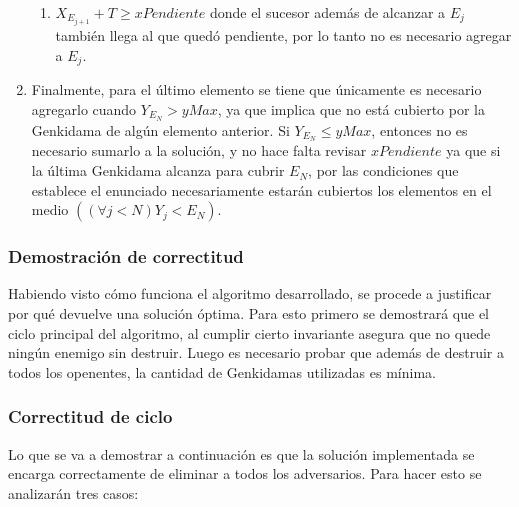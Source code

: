\begin{enumerate}
{\begin{enumerate}
{\begin{enumerate}
{\begin{enumerate}
{									alcanza a un enemigo que quedó dependiendo de
									una futura Genkidama, por lo tanto debo agregar
									a $E_j$. Se asignan $xPendiente = 0$ y $maxY = Y_{E_j} + T$.
								}
								\item{
									\label{ej2_imp:caso_cubierto}
									$X_{E_{j+1}} + T \geq xPendiente$ donde el
									sucesor además de alcanzar a $E_j$ también llega
									al que quedó pendiente, por lo tanto no es
									necesario agregar a	$E_j$.
								}
							\end{enumerate}
						}
					\end{enumerate}
				}
				\end{enumerate}
			}
			\item{
				\label{ej2_imp:caso_n}
				Finalmente, para el último elemento se tiene que únicamente
				es necesario agregarlo cuando $Y_{E_N} > yMax$, ya que
				implica que no está cubierto por la Genkidama de algún
				elemento anterior. Si $Y_{E_N} \leq yMax$, entonces no es
				necesario sumarlo a la solución, y no hace falta revisar
				$xPendiente$ ya que si la última Genkidama alcanza para
				cubrir $E_N$, por las condiciones que establece el
				enunciado necesariamente estarán cubiertos los elementos en
				el medio $((\forall j < N) Y_j < E_N)$.
			}
	\end{enumerate}

	\subsubsection{Demostración de correctitud}

	Habiendo visto cómo funciona el algoritmo desarrollado, se procede a
	justificar por qué devuelve una solución óptima. Para esto primero se
	demostrará que el ciclo principal del algoritmo, al cumplir cierto
	invariante asegura que no quede ningún enemigo sin destruir. Luego es
	necesario probar que además de destruir a todos los openentes, la cantidad
	de Genkidamas utilizadas es mínima.

	\subsubsection*{Correctitud de ciclo}

	Lo que se va a demostrar a continuación es que la solución implementada se
	encarga correctamente de eliminar a todos los adversarios. Para hacer esto
	se analizarán tres casos:

